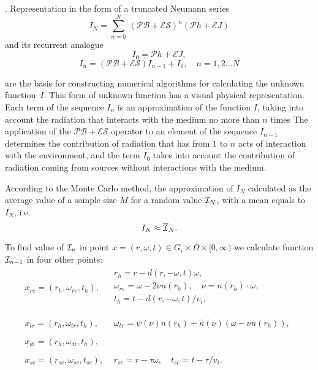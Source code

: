 \documentclass[12pt,reqno]{report}
\begin{document}
\cite{34}. 
Representation in the form of a truncated Neumann series
\begin{equation}
I_N = \sum_{n=0}^{N}\ (\mathcal{PB} + \mathcal{ES})^n (\mathcal P h
+ \mathcal E J)
\end{equation}
and its recurrent analogue
\begin{equation}
I_0 = \mathcal P h + \mathcal E J,
\end{equation}
\begin{equation}
I_n = (\mathcal{PB} + \mathcal{ES}) I_{n-1} + I_0,\quad n = 1, 2 \dots N
\end{equation}


are the basis for constructing numerical algorithms for calculating the unknown function~$I$. 
This form of unknown function has a visual physical representation.
Each term of the sequence $I_n$ is an approximation of the function $I$, 
taking into account the radiation that interacts with the medium no more than $n$ times
The application of the $\mathcal{PB} + \mathcal{ES}$ operator to an element of the sequence $I_ {n-1}$ 
determines the contribution of radiation that has from $1$ to $n$ acts of interaction with the environment, 
and the term $I_0$ takes into account the contribution of radiation coming from sources without 
interactions with the medium.

According to the Monte Carlo method, the approximation of $I_N$
calculated as the average value of a sample size $M$ for a random
value ${\cal I}_N$, with a mean equals to $I_N$, i.e.
\begin{equation}
I_N \approx \overline{\cal I}_{N}.
\end{equation}

To find value of ${\cal I}_{n}$ in point
$x=(r,\omega,t)\in G_i \times \Omega \times [0,\infty)$
we calculate function ${\cal I}_{n-1}$ in four other points:
\begin{equation}
\begin{array}{ll}
  x_{re}=(r_h,\omega_{re}, t_h), &
  \begin{array}{l}
    r_h = r - d(r,-\omega,t)\omega,\\
    \omega_{re} = \omega - 2\nu n(r_h),  \quad  \nu=n(r_h) \cdot \omega,\\
    t_h = t - d(r,-\omega,t)/v_i, \\
  \end{array}%
\\
\\
  x_{tr}=(r_h,\omega_{tr},t_h), &
  \begin{array}{l}
    \omega_{tr}=\psi (\nu)
    n(r_h) + \widetilde{\kappa}(\nu)( \omega -  \nu n(r_h)),
  \end{array}
\\
\\
  x_{di}=(r_{h},\omega_{di},t_{h}), &
\\
\\
  x_{sc}=(r_{sc},\omega_{sc},t_{sc}), &
  \begin{array}{l}
    r_{sc}=r-\tau \omega, \quad
    t_{sc}=t-\tau/v_i.
  \end{array}
\end{array}
\end{equation}
\end{document}

